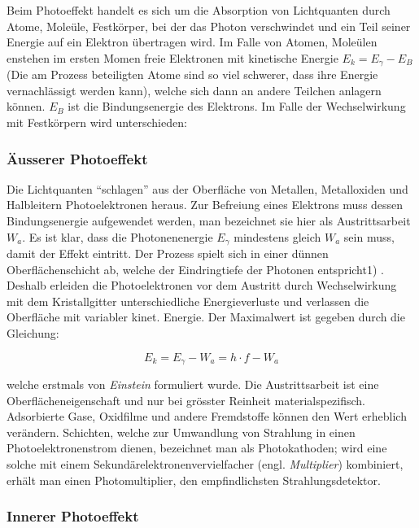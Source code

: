 Beim Photoeffekt  handelt  es  sich  um  die Absorption von Lichtquanten durch
Atome, Mole\"ule, Festk\"orper, bei der  das  Photon verschwindet und ein Teil
seiner  Energie  auf  ein  Elektron  \"ubertragen  wird.  Im Falle von Atomen,
Mole\"ulen  enstehen  im  ersten Momen freie Elektronen mit kinetische Energie
$E_k = E_{\gamma} -  E_B$  (Die  am  Prozess  beteiligten  Atome  sind so viel
schwerer, dass ihre Energie vernachl\"assigt werden kann), welche sich dann an
andere  Teilchen  anlagern   k\"onnen.   $E_B$  ist  die  Bindungsenergie  des
Elektrons.  Im Falle der Wechselwirkung mit Festk\"orpern wird  unterschieden:


\subsubsection{\"Ausserer Photoeffekt}

Die Lichtquanten ``schlagen'' aus der Oberfl\"ache von  Metallen, Metalloxiden
und  Halbleitern  Photoelektronen  heraus. Zur Befreiung eines Elektrons  muss
dessen  Bindungsenergie  aufgewendet  werden,  man  bezeichnet  sie  hier  als
Austrittsarbeit  $W_a$.  Es ist klar, dass  die  Photonenenergie  $E_{\gamma}$
mindestens  gleich  $W_a$  sein muss, damit der Effekt eintritt.  Der  Prozess
spielt   sich   in   einer   d\"unnen  Oberfl\"achenschicht  ab,  welche   der
Eindringtiefe der Photonen entspricht1) . Deshalb erleiden die Photoelektronen
vor dem Austritt durch Wechselwirkung  mit dem Kristallgitter unterschiedliche
Energieverluste und verlassen die Oberfl\"ache mit variabler  kinet.  Energie.
Der Maximalwert ist gegeben durch die Gleichung:

\begin{equation}
    E_k = E_{\gamma} - W_a = h \cdot f - W_a
\end{equation}

welche erstmals von  \textit{Einstein}  formuliert  wurde. Die Austrittsarbeit
ist   eine   Oberfl\"acheneigenschaft   und   nur   bei   gr\"osster  Reinheit
materialspezifisch.   Adsorbierte  Gase,  Oxidfilme  und  andere   Fremdstoffe
k\"onnen den  Wert erheblich ver\"andern. Schichten, welche zur Umwandlung von
Strahlung  in   einen   Photoelektronenstrom   dienen,   bezeichnet   man  als
Photokathoden; wird eine solche  mit  einem  Sekund\"arelektronenvervielfacher
(engl. \textit{Multiplier}) kombiniert,  erh\"alt  man  einen Photomultiplier,
den empfindlichsten Strahlungsdetektor.


\subsubsection{Innerer Photoeffekt}

